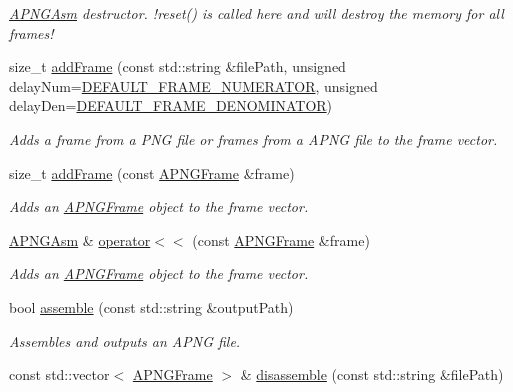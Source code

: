 \begin{DoxyCompactItemize}
\begin{DoxyCompactList}\small\item\em \hyperlink{classapngasm_1_1APNGAsm}{A\-P\-N\-G\-Asm} destructor. !reset() is called here and will destroy the memory for all frames! \end{DoxyCompactList}\item 
size\-\_\-t \hyperlink{classapngasm_1_1APNGAsm_a937cbf8260ee5ce8ae1a589fb07e357f}{add\-Frame} (const std\-::string \&file\-Path, unsigned delay\-Num=\hyperlink{namespaceapngasm_a5b334b6957e14291ff8f76cab562f60f}{D\-E\-F\-A\-U\-L\-T\-\_\-\-F\-R\-A\-M\-E\-\_\-\-N\-U\-M\-E\-R\-A\-T\-O\-R}, unsigned delay\-Den=\hyperlink{namespaceapngasm_a867b3acbcc2624faf6b3e82732110594}{D\-E\-F\-A\-U\-L\-T\-\_\-\-F\-R\-A\-M\-E\-\_\-\-D\-E\-N\-O\-M\-I\-N\-A\-T\-O\-R})
\begin{DoxyCompactList}\small\item\em Adds a frame from a P\-N\-G file or frames from a A\-P\-N\-G file to the frame vector. \end{DoxyCompactList}\item 
size\-\_\-t \hyperlink{classapngasm_1_1APNGAsm_ab90be230c206a50f9b2cb9ff64f932bc}{add\-Frame} (const \hyperlink{classapngasm_1_1APNGFrame}{A\-P\-N\-G\-Frame} \&frame)
\begin{DoxyCompactList}\small\item\em Adds an \hyperlink{classapngasm_1_1APNGFrame}{A\-P\-N\-G\-Frame} object to the frame vector. \end{DoxyCompactList}\item 
\hyperlink{classapngasm_1_1APNGAsm}{A\-P\-N\-G\-Asm} \& \hyperlink{classapngasm_1_1APNGAsm_ad3c3260ad6a8b004ccb955c9425d5053}{operator$<$$<$} (const \hyperlink{classapngasm_1_1APNGFrame}{A\-P\-N\-G\-Frame} \&frame)
\begin{DoxyCompactList}\small\item\em Adds an \hyperlink{classapngasm_1_1APNGFrame}{A\-P\-N\-G\-Frame} object to the frame vector. \end{DoxyCompactList}\item 
bool \hyperlink{classapngasm_1_1APNGAsm_ae2d72070a6f76248e717c027c2c19bbd}{assemble} (const std\-::string \&output\-Path)
\begin{DoxyCompactList}\small\item\em Assembles and outputs an A\-P\-N\-G file. \end{DoxyCompactList}\item 
const std\-::vector$<$ \hyperlink{classapngasm_1_1APNGFrame}{A\-P\-N\-G\-Frame} $>$ \& \hyperlink{classapngasm_1_1APNGAsm_ab905012a98e04946623252b5561453aa}{disassemble} (const std\-::string \&file\-Path)

\end{DoxyCompactItemize}
